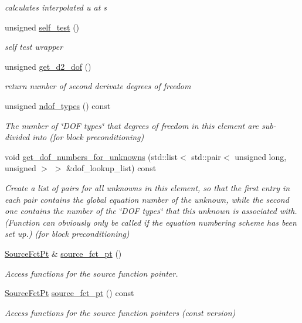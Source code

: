 \begin{DoxyCompactItemize}
\begin{DoxyCompactList}\small\item\em calculates interpolated u at s \end{DoxyCompactList}\item 
unsigned \hyperlink{classoomph_1_1BiharmonicEquations_a45c5d9248207cb2f3fa584e2b8137d82}{self\+\_\+test} ()
\begin{DoxyCompactList}\small\item\em self test wrapper \end{DoxyCompactList}\item 
unsigned \hyperlink{classoomph_1_1BiharmonicEquations_ade58315d59e79499aec5b08aac9c2d16}{get\+\_\+d2\+\_\+dof} ()
\begin{DoxyCompactList}\small\item\em return number of second derivate degrees of freedom \end{DoxyCompactList}\item 
unsigned \hyperlink{classoomph_1_1BiharmonicEquations_abf1fbd964ed367a0bf24854ee76aa8f4}{ndof\+\_\+types} () const
\begin{DoxyCompactList}\small\item\em The number of \char`\"{}\+D\+O\+F types\char`\"{} that degrees of freedom in this element are sub-\/divided into (for block preconditioning) \end{DoxyCompactList}\item 
void \hyperlink{classoomph_1_1BiharmonicEquations_af36d72e588624eccb8956a3d0d4959b2}{get\+\_\+dof\+\_\+numbers\+\_\+for\+\_\+unknowns} (std\+::list$<$ std\+::pair$<$ unsigned long, unsigned $>$ $>$ \&dof\+\_\+lookup\+\_\+list) const
\begin{DoxyCompactList}\small\item\em Create a list of pairs for all unknowns in this element, so that the first entry in each pair contains the global equation number of the unknown, while the second one contains the number of the \char`\"{}\+D\+O\+F types\char`\"{} that this unknown is associated with. (Function can obviously only be called if the equation numbering scheme has been set up.) (for block preconditioning) \end{DoxyCompactList}\item 
\hyperlink{classoomph_1_1BiharmonicEquations_aafa48cd7bbc8ce4383224d1d2d0bfda3}{Source\+Fct\+Pt} \& \hyperlink{classoomph_1_1BiharmonicEquations_adc6fb5197bfb8635b43e3bdfcc91d676}{source\+\_\+fct\+\_\+pt} ()
\begin{DoxyCompactList}\small\item\em Access functions for the source function pointer. \end{DoxyCompactList}\item 
\hyperlink{classoomph_1_1BiharmonicEquations_aafa48cd7bbc8ce4383224d1d2d0bfda3}{Source\+Fct\+Pt} \hyperlink{classoomph_1_1BiharmonicEquations_afc6b6019723e9915af2013eb911235e4}{source\+\_\+fct\+\_\+pt} () const
\begin{DoxyCompactList}\small\item\em Access functions for the source function pointers (const version) \end{DoxyCompactList}\end{DoxyCompactItemize}

